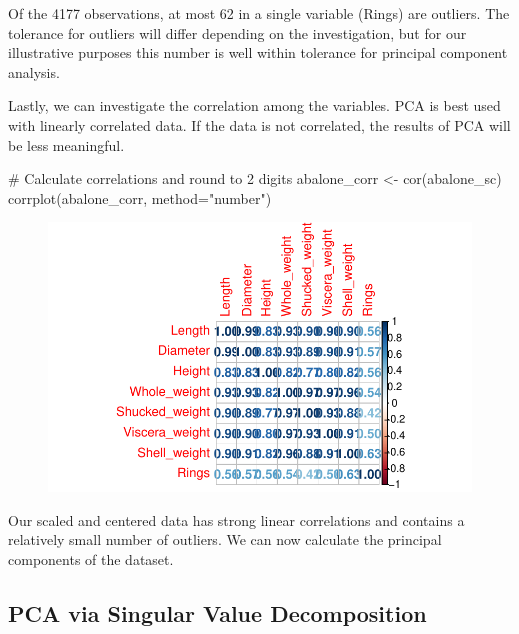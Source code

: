 \documentclass[
  letterpaper,
  DIV=11,
  numbers=noendperiod]{scrreprt}
\newenvironment{Shaded}{\begin{snugshade}}{\end{snugshade}}
\newcommand{\AttributeTok}[1]{\textcolor[rgb]{0.40,0.45,0.13}{#1}}
\newcommand{\CommentTok}[1]{\textcolor[rgb]{0.37,0.37,0.37}{#1}}
\newcommand{\FunctionTok}[1]{\textcolor[rgb]{0.28,0.35,0.67}{#1}}
\newcommand{\NormalTok}[1]{\textcolor[rgb]{0.00,0.23,0.31}{#1}}
\newcommand{\OtherTok}[1]{\textcolor[rgb]{0.00,0.23,0.31}{#1}}
\newcommand{\StringTok}[1]{\textcolor[rgb]{0.13,0.47,0.30}{#1}}
\begin{document}
Of the 4177 observations, at most 62 in a single variable (Rings) are
outliers. The tolerance for outliers will differ depending on the
investigation, but for our illustrative purposes this number is well
within tolerance for principal component analysis.

Lastly, we can investigate the correlation among the variables. PCA is
best used with linearly correlated data. If the data is not correlated,
the results of PCA will be less meaningful.

\begin{Shaded}
\begin{Highlighting}[]
\CommentTok{\# Calculate correlations and round to 2 digits}
\NormalTok{abalone\_corr }\OtherTok{\textless{}{-}} \FunctionTok{cor}\NormalTok{(abalone\_sc)}
\FunctionTok{corrplot}\NormalTok{(abalone\_corr, }\AttributeTok{method=}\StringTok{"number"}\NormalTok{)}
\end{Highlighting}
\end{Shaded}

\begin{figure}[H]

{\centering \includegraphics{examples_files/figure-pdf/unnamed-chunk-7-1.pdf}

}

\end{figure}

Our scaled and centered data has strong linear correlations and contains
a relatively small number of outliers. We can now calculate the
principal components of the dataset.

\hypertarget{pca-via-singular-value-decomposition}{%
\subsection{PCA via Singular Value
Decomposition}\label{pca-via-singular-value-decomposition}}
\end{document}
